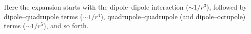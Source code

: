 Here the expansion starts with the dipole--dipole interaction ($\sim1/r^3$), followed by dipole--quadrupole terms ($\sim1/r^4$), quadrupole--quadrupole (and dipole--octupole) terms ($\sim1/r^5$), and so forth.
